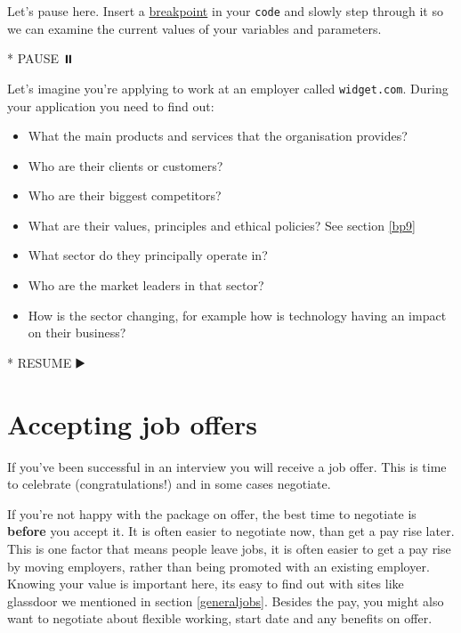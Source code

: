 \documentclass[
]{book}
\newenvironment{Shaded}{\begin{snugshade}}{\end{snugshade}}
\newcommand{\NormalTok}[1]{#1}
\newcommand{\SpecialStringTok}[1]{\textcolor[rgb]{0.31,0.60,0.02}{#1}}
\providecommand{\tightlist}{%
  \setlength{\itemsep}{0pt}\setlength{\parskip}{0pt}}
\begin{document}
Let's pause here. Insert a \href{https://en.wikipedia.org/wiki/Breakpoint}{breakpoint} in your \texttt{code} and slowly step through it so we can examine the current values of your variables and parameters.

\begin{Shaded}
\begin{Highlighting}[]
\SpecialStringTok{* }\NormalTok{PAUSE ⏸️}
\end{Highlighting}
\end{Shaded}

Let's imagine you're applying to work at an employer called \texttt{widget.com}. During your application you need to find out:

\begin{itemize}
\tightlist
\item
  What the main products and services that the organisation provides?
\item
  Who are their clients or customers?
\item
  Who are their biggest competitors?
\item
  What are their values, principles and ethical policies? See section \ref{bp9}
\item
  What sector do they principally operate in?
\item
  Who are the market leaders in that sector?
\item
  How is the sector changing, for example how is technology having an impact on their business?
\end{itemize}

\begin{Shaded}
\begin{Highlighting}[]
\SpecialStringTok{* }\NormalTok{RESUME ▶️}
\end{Highlighting}
\end{Shaded}

\hypertarget{offer}{%
\section{Accepting job offers}\label{offer}}

If you've been successful in an interview you will receive a job offer. This is time to celebrate (congratulations!) and in some cases negotiate.

If you're not happy with the package on offer, the best time to negotiate is \textbf{before} you accept it. It is often easier to negotiate now, than get a pay rise later. This is one factor that means people leave jobs, it is often easier to get a pay rise by moving employers, rather than being promoted with an existing employer. Knowing your value is important here, its easy to find out with sites like glassdoor we mentioned in section \ref{generaljobs}.
Besides the pay, you might also want to negotiate about flexible working, start date and any benefits on offer.
\end{document}
